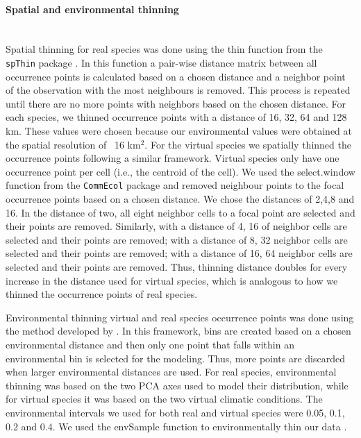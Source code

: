 \paragraph*{Spatial and environmental thinning}\mbox{}\\ 
Spatial thinning for real species was done using the thin function from the \texttt{spThin} package \parencite{aiello2015}. In this function a pair-wise distance matrix between all occurrence points is calculated based on a chosen distance and a neighbor point of the observation with the most neighbours is removed. This process is repeated until there are no more points with neighbors based on the chosen distance. For each species, we thinned occurrence points with a distance of 16, 32, 64 and 128 km. These values were chosen because our environmental values were obtained at the spatial resolution of ~16 km$^2$. For the virtual species we spatially thinned the occurrence points following a similar framework. Virtual species only have one occurrence point per cell (i.e., the centroid of the cell). We used the select.window function from the \texttt{CommEcol} package \parencite{melo2019} and removed neighbour points to the focal occurrence points based on a chosen distance. We chose the distances of 2,4,8 and 16. In the distance of two, all eight neighbor cells to a focal point are selected and their points are removed. Similarly, with a distance of 4, 16 of neighbor cells are selected and their points are removed; with a distance of 8, 32 neighbor cells are selected and their points are removed; with a distance of 16, 64 neighbor cells are selected and their points are removed. Thus, thinning distance doubles for every increase in the distance used for virtual species, which is analogous to how we thinned the occurrence points of real species.

Environmental thinning virtual and real species occurrence points was done using the method developed by \textcite{varela2014}. In this framework, bins are created based on a chosen environmental distance and then only one point that falls within an environmental bin is selected for the modeling. Thus, more points are discarded when larger environmental distances are used. For real species, environmental thinning was based on the two PCA axes used to model their distribution, while for virtual species it was based on the two virtual climatic conditions. The environmental intervals we used for both real and virtual species were 0.05, 0.1, 0.2 and 0.4. We used the envSample function to environmentally thin our data \parencite{varela2014}. 

